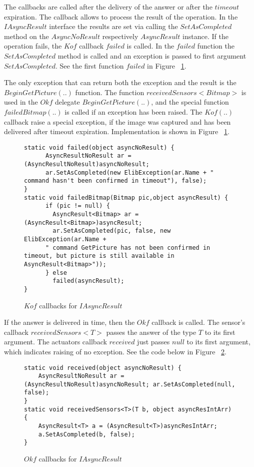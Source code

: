 	The callbacks are called after the delivery of the answer or after the $timeout$ expiration.
	The callback allows to process the result of the operation.
	In the $IAsyncResult$ interface the results are set via calling the $SetAsCompleted$ method 
	on the $AsyncNoResult$ respectively $AsyncResult$ instance.
	If the operation fails, the $Kof$ callback $failed$ is called. 
	In the $failed$ function the $SetAsCompleted$ method is called and an exception is passed to first argument $SetAsCompleted$.
	See the first function $failed$ in Figure ~\ref{Ikofs}.

	The only exception that can return both the exception and the result is the $BeginGetPicture(..)$ function.
	The function $receivedSensors<Bitmap>$ is used in the $Okf$ delegate $BeginGetPicture(..)$, and 
	the special function $failedBitmap(..)$ is called if an exception has been raised.
	The $Kof(..)$ callback raise a special exception, if the image was captured and has been 
	delivered after timeout expiration.
	Implementation is shown in Figure ~\ref{Ikofs}. 

	
\begin{figure}[!hbp]
\begin{lstlisting}
static void failed(object asyncNoResult) {
      AsyncResultNoResult ar = (AsyncResultNoResult)asyncNoResult;
      ar.SetAsCompleted(new ElibException(ar.Name + " command hasn't been confirmed in timeout"), false); 
}
static void failedBitmap(Bitmap pic,object asyncResult) {
      if (pic != null) {
        AsyncResult<Bitmap> ar = (AsyncResult<Bitmap>)asyncResult;        
        ar.SetAsCompleted(pic, false, new ElibException(ar.Name + 
	  " command GetPicture has not been confirmed in timeout, but picture is still available in AsyncResult<Bitmap>"));
      } else
        failed(asyncResult);
}
\end{lstlisting}	
\caption{$Kof$ callbacks for $IAsyncResult$} \label{Ikofs}
\end{figure}


	If the answer is delivered in time, then the $Okf$ callback is called.
	The sensor's callback $receivedSensors<T>$ passes the answer of the type $T$ to its first argument.
	The actuators callback $received$ just passes $null$ to its first argument, which indicates
	raising of no exception.
	See the code below in Figure ~\ref{Iokfs}.


\begin{figure}[!hbp]
\begin{lstlisting}
static void received(object asyncNoResult) {
	AsyncResultNoResult ar = (AsyncResultNoResult)asyncNoResult; ar.SetAsCompleted(null, false); 
}
static void receivedSensors<T>(T b, object asyncResIntArr) {
	AsyncResult<T> a = (AsyncResult<T>)asyncResIntArr;
	a.SetAsCompleted(b, false);
}
\end{lstlisting}	
\caption{$Okf$ callbacks for $IAsyncResult$} \label{Iokfs}
\end{figure}

